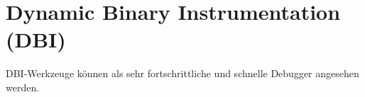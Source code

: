 \chapter{Dynamic Binary Instrumentation (DBI)}

\ac{DBI}-Werkzeuge können als sehr fortschrittliche und schnelle Debugger angesehen werden.

%
%
%
%
%
%
